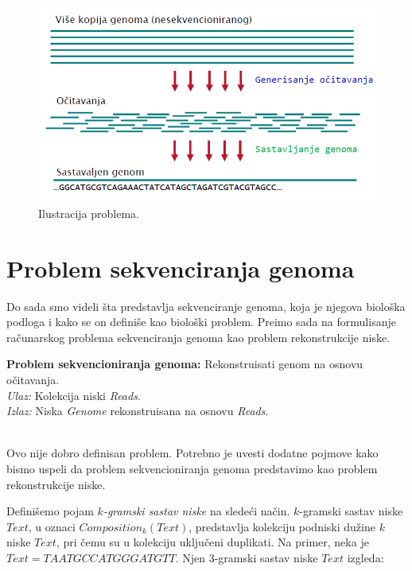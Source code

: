 \begin{figure}[h]
	\centering
	\includegraphics[width=1\textwidth]{poglavlja/3/slike/sekvencioniranje.png}
	\caption{Ilustracija problema.}
	\label{slika:sekvenciranje}
\end{figure} 

\section{Problem sekvenciranja genoma}

Do sada smo videli \v sta predstavlja sekvenciranje genoma, koja je njegova biolo\v ska podloga i kako se on defini\v se kao biolo\v ski problem. Pre\dj imo sada na formulisanje ra\v cunarskog problema sekvenciranja genoma kao problem rekonstrukcije niske.
~ \\
\begin{tcolorbox}
	\textbf{Problem sekvencioniranja genoma:} Rekonstruisati genom na osnovu očitavanja. \\
	\textit{Ulaz:} Kolekcija niski \emph{Reads}.\\
	\textit{Izlaz:} Niska \emph{Genome} rekonstruisana na osnovu \emph{Reads}.
\end{tcolorbox}

~\\
Ovo nije dobro definisan problem. Potrebno je uvesti dodatne pojmove kako bismo uspeli da problem sekvencioniranja genoma predstavimo kao problem rekonstrukcije niske.

Defini\v semo pojam \emph{$k$-gramski sastav niske} na slede\'ci na\v cin. $k$-gramski sastav niske $Text$, u oznaci $Composition_k(Text)$, predstavlja kolekciju podniski dužine $k$ niske $Text$, pri \v cemu su u kolekciju uključeni duplikati. Na primer, neka je $Text=TAATGCCATGGGATGTT$. Njen $3$-gramski sastav niske $Text$ izgleda:

